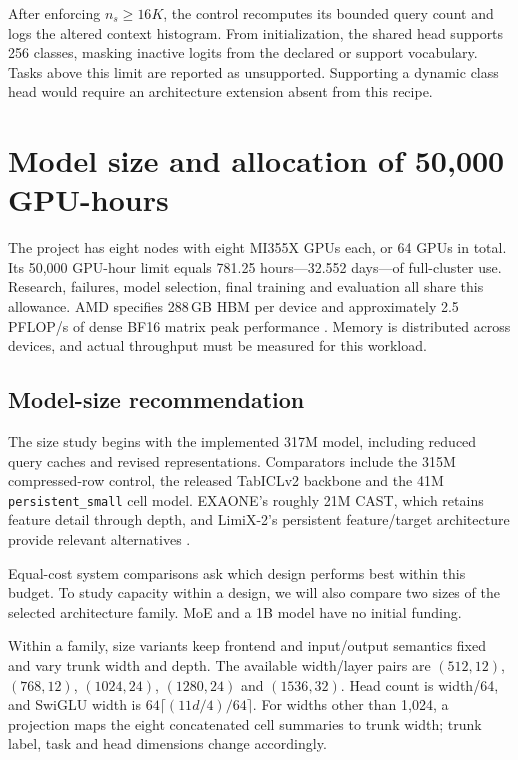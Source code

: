 \documentclass[11pt]{article}
\begin{document}
After enforcing $n_s\geq16K$, the control recomputes its bounded query count and logs the altered context histogram. From initialization, the shared head supports 256 classes, masking inactive logits from the declared or support vocabulary. Tasks above this limit are reported as unsupported. Supporting a dynamic class head would require an architecture extension absent from this recipe.


\section{Model size and allocation of 50,000 GPU-hours}
\label{sec:compute}

The project has eight nodes with eight MI355X GPUs each, or 64 GPUs in total. Its 50,000 GPU-hour limit equals 781.25 hours---32.552 days---of full-cluster use. Research, failures, model selection, final training and evaluation all share this allowance. AMD specifies 288\,GB HBM per device and approximately 2.5 PFLOP/s of dense BF16 matrix peak performance \cite{amd}. Memory is distributed across devices, and actual throughput must be measured for this workload.

\subsection{Model-size recommendation}

The size study begins with the implemented 317M model, including reduced query caches and revised representations. Comparators include the 315M compressed-row control, the released TabICLv2 backbone and the 41M \texttt{persistent\_small} cell model. EXAONE's roughly 21M CAST, which retains feature detail through depth, and LimiX-2's persistent feature/target architecture provide relevant alternatives \cite{exaone,limix2}.

Equal-cost system comparisons ask which design performs best within this budget. To study capacity within a design, we will also compare two sizes of the selected architecture family. MoE and a 1B model have no initial funding.

Within a family, size variants keep frontend and input/output semantics fixed and vary trunk width and depth. The available width/layer pairs are $(512,12)$, $(768,12)$, $(1024,24)$, $(1280,24)$ and $(1536,32)$. Head count is width/64, and SwiGLU width is $64\lceil(11d/4)/64\rceil$. For widths other than 1,024, a projection maps the eight concatenated cell summaries to trunk width; trunk label, task and head dimensions change accordingly.
\end{document}
